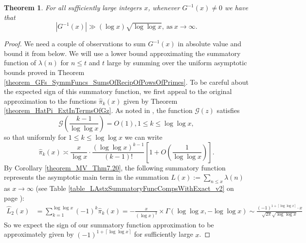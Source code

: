 \documentclass[11pt,reqno,a4letter]{article}
\numberwithin{figure}{section}
\numberwithin{table}{section}
\newcommand{\ceiling}[1]{\left\lceil #1 \right\rceil}
\theoremstyle{plain}
\newtheorem{theorem}{Theorem}
\numberwithin{theorem}{section}
\theoremstyle{definition}
\begin{document}
\begin{theorem} 
\label{theorem_GInvxLowerBoundByGEInvx_v1} 
For all sufficiently large integers $x$, whenever $G^{-1}(x) \neq 0$ we have that 
\[
|G^{-1}(x)| \gg (\log x) \sqrt{\log\log x}, \mathrm{\ as\ } x \rightarrow \infty. 
\]
\end{theorem} 
\begin{proof} 
We need a couple of observations to sum $G^{-1}(x)$ in absolute value and bound it from below. 
We will use a lower bound approximating the summatory function of $\lambda(n)$ for $n \leq t$ and 
$t$ large by summing over the uniform asymptotic bounds proved in 
Theorem \ref{theorem_GFs_SymmFuncs_SumsOfRecipOfPowsOfPrimes}. 
To be careful about the expected sign of this summatory function, 
we first appeal to the original approximation to the functions $\widehat{\pi}_k(x)$ 
given by Theorem \ref{theorem_HatPi_ExtInTermsOfGz}. 
As noted in \cite[\S 7.4]{MV}, the function $\mathcal{G}(z)$ satisfies 
\[
\mathcal{G}\left(\frac{k-1}{\log\log x}\right) = O(1), 1 \leq k \leq \log\log x, 
\]
so that uniformly for $1 \leq k \leq \log\log x$ we can write 
\[
\widehat{\pi}_k(x) \asymp \frac{x}{\log x} \cdot \frac{(\log\log x)^{k-1}}{(k-1)!} \left[ 
     1 + O\left(\frac{1}{\log\log x}\right)\right]. 
\]
By Corollary \ref{theorem_MV_Thm7.20}, the 
following summatory function represents the asymptotic main term 
in the summation $L(x) := \sum_{n \leq x} \lambda(n)$ as $x \rightarrow \infty$ 
(see Table \ref{table_LAstxSummatoryFuncCompsWithExact_v2} on page 
\pageref{table_LAstxSummatoryFuncCompsWithExact_v2}): 
\begin{align*} 
\widehat{L}_2(x) & = \sum_{k=1}^{\log\log x} (-1)^{k} \widehat{\pi}_k(x) 
     = - \frac{x}{(\log x)^2} \times \Gamma(\log\log x, -\log\log x) 
     \sim \frac{(-1)^{1+\ceiling{\log\log x}} \cdot x}{\sqrt{2\pi} \sqrt{\log\log x}}
\end{align*} 
So we expect the sign of our summatory function approximation to be approximately 
given by $(-1)^{1+\ceiling{\log\log x}}$ for sufficiently large $x$. 


\end{proof}
\end{document}
